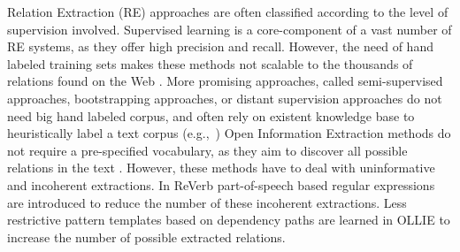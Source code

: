Relation Extraction (RE) approaches are often classified according to the level of supervision involved.
Supervised learning is a core-component of a vast number of RE systems, as they offer high precision and recall. However, the need of hand labeled training sets makes these methods not scalable to the thousands of relations found on the Web \citep{Hoffmann2011}.
More promising approaches, called semi-supervised approaches, bootstrapping approaches, or distant supervision approaches do not need big hand labeled corpus, and
often rely on existent knowledge base to heuristically label a text corpus (e.g.,~\citep{Carlson2010,Hoffmann2011})
Open Information Extraction methods do not require a pre-specified vocabulary, as they aim to discover all possible relations in the text \citep{Banko2007}.
However, these methods have to deal with uninformative and incoherent extractions. In ReVerb \citep{Fader2011} part-of-speech based regular expressions are introduced to reduce the number of these incoherent extractions. Less restrictive pattern templates based on dependency paths are learned in OLLIE \citep{Mausam2012} to increase the number of possible extracted relations.
